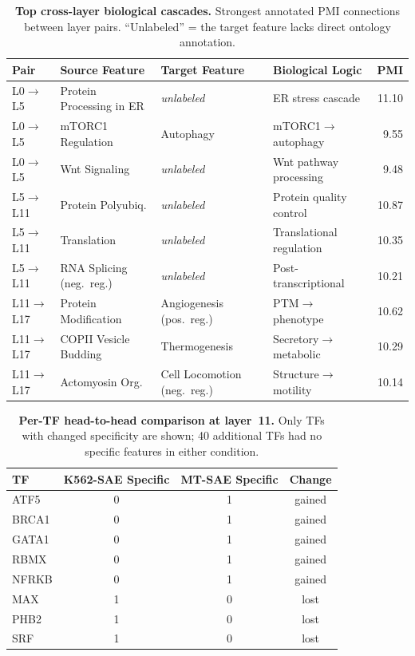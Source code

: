 \documentclass[onecolumn]{article}
\begin{document}
\begin{table}[H]
\centering
\caption{\textbf{Top cross-layer biological cascades.} Strongest annotated PMI connections between layer pairs. ``Unlabeled'' = the target feature lacks direct ontology annotation.}
\label{tab:cascades}
\smallskip
\small
\begin{tabular}{lp{2.6cm}p{2.6cm}p{3.2cm}r}
\toprule
Pair & Source Feature & Target Feature & Biological Logic & PMI \\
\midrule
L0$\to$L5  & Protein Processing in ER & \textit{unlabeled} & ER stress cascade & 11.10 \\
L0$\to$L5  & mTORC1 Regulation & Autophagy & mTORC1$\to$autophagy & 9.55 \\
L0$\to$L5  & Wnt Signaling & \textit{unlabeled} & Wnt pathway processing & 9.48 \\
\midrule
L5$\to$L11 & Protein Polyubiq. & \textit{unlabeled} & Protein quality control & 10.87 \\
L5$\to$L11 & Translation & \textit{unlabeled} & Translational regulation & 10.35 \\
L5$\to$L11 & RNA Splicing (neg.\ reg.) & \textit{unlabeled} & Post-transcriptional & 10.21 \\
\midrule
L11$\to$L17 & Protein Modification & Angiogenesis (pos.\ reg.) & PTM$\to$phenotype & 10.62 \\
L11$\to$L17 & COPII Vesicle Budding & Thermogenesis & Secretory$\to$metabolic & 10.29 \\
L11$\to$L17 & Actomyosin Org. & Cell Locomotion (neg.\ reg.) & Structure$\to$motility & 10.14 \\
\bottomrule
\end{tabular}
\end{table}


\begin{table}[H]
\centering
\caption{\textbf{Per-TF head-to-head comparison at layer~11.} Only TFs with changed specificity are shown; 40 additional TFs had no specific features in either condition.}
\label{tab:per_tf}
\smallskip
\begin{tabular}{lccc}
\toprule
TF & K562-SAE Specific & MT-SAE Specific & Change \\
\midrule
ATF5  & 0 & 1 & gained \\
BRCA1 & 0 & 1 & gained \\
GATA1 & 0 & 1 & gained \\
RBMX  & 0 & 1 & gained \\
NFRKB & 0 & 1 & gained \\
\midrule
MAX   & 1 & 0 & lost \\
PHB2  & 1 & 0 & lost \\
SRF   & 1 & 0 & lost \\
\bottomrule
\end{tabular}
\end{table}
\end{document}
